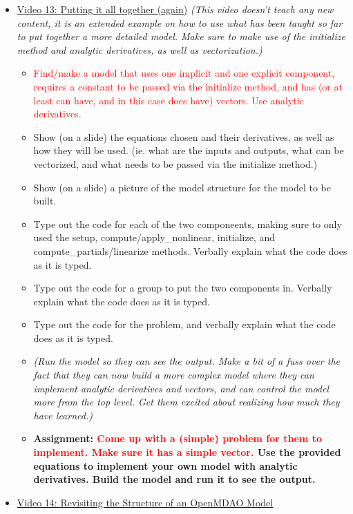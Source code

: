 \documentclass[12pt, letterpaper]{article}
\begin{document}
\begin{itemize}
\begin{itemize}
		\end{itemize}
	\item \underline{Video 13: Putting it all together (again)} \textit{(This video doesn’t teach any new content, it is an extended example on how to use what has been taught so far to put together a more detailed model. Make sure to make use of the initialize method and analytic derivatives, as well as vectorization.)}
		\begin{itemize}
			\item \textcolor{red}{Find/make a model that uses one implicit and one explicit component, requires a constant to be passed via the initialize method, and has (or at least can have, and in this case does have) vectors. Use analytic derivatives.}
			\item Show (on a slide) the equations chosen and their derivatives, as well as how they will be used. (ie. what are the inputs and outputs, what can be vectorized, and what needs to be passed via the initialize method.)
			\item Show (on a slide) a picture of the model structure for the model to be built.
			\item Type out the code for each of the two componeents, making sure to only used the setup, compute/apply\_nonlinear, initialize, and compute\_partials/linearize methods. Verbally explain what the code does as it is typed.
			\item Type out the code for a group to put the two components in. Verbally explain what the code does as it is typed.
			\item Type out the code for the problem, and verbally explain what the code does as it is typed.
			\item \textit{(Run the model so they can see the output. Make a bit of a fuss over the fact that they can now build a more complex model where they can implement analytic derivatives and vectors, and can control the model more from the top level. Get them excited about realizing how much they have learned.)}
			\item \textbf{Assignment: \textcolor{red}{Come up with a (simple) problem for them to implement. Make sure it has a simple vector.} Use the provided equations to implement your own model with analytic derivatives. Build the model and run it to see the output.}
		\end{itemize}
	\item \underline{Video 14: Revisiting the Structure of an OpenMDAO Model}
		\begin{itemize}

\end{itemize}
\end{itemize}
\end{document}
